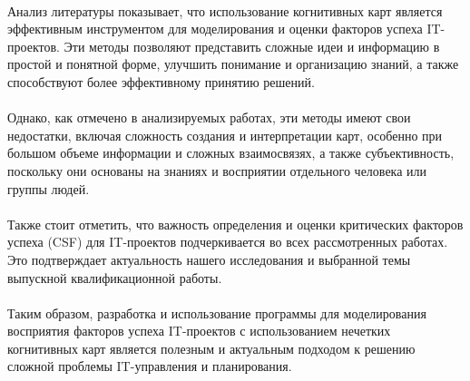 \documentclass{article}
\begin{document}
    ~\\
    Анализ литературы показывает, что использование когнитивных карт является эффективным инструментом для моделирования и оценки факторов успеха IT-проектов. Эти методы позволяют представить сложные идеи и информацию в простой и понятной форме, улучшить понимание и организацию знаний, а также способствуют более эффективному принятию решений.\\
    ~\\
    Однако, как отмечено в анализируемых работах, эти методы имеют свои недостатки, включая сложность создания и интерпретации карт, особенно при большом объеме информации и сложных взаимосвязях, а также субъективность, поскольку они основаны на знаниях и восприятии отдельного человека или группы людей.\\
    ~\\
    Также стоит отметить, что важность определения и оценки критических факторов успеха (CSF) для IT-проектов подчеркивается во всех рассмотренных работах. Это подтверждает актуальность нашего исследования и выбранной темы выпускной квалификационной работы.\\
    ~\\
    Таким образом, разработка и использование программы для моделирования восприятия факторов успеха IT-проектов с использованием нечетких когнитивных карт является полезным и актуальным подходом к решению сложной проблемы IT-управления и планирования.\\
\end{document}
